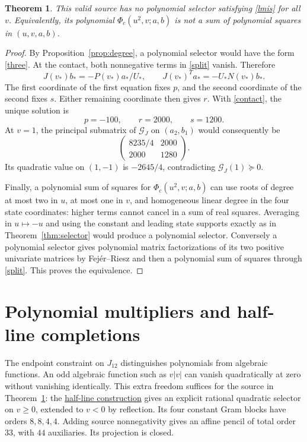 \documentclass[11pt]{article}
\newtheorem{theorem}{Theorem}
\newcommand{\PSD}{\succeq0}
\begin{document}
\begin{theorem}\label{thm:obstruction}
This valid source has no polynomial selector satisfying \eqref{lmis} for all
$v$. Equivalently, its polynomial $\Phi_c(u^2,v;a,b)$ is not a sum of polynomial
squares in $(u,v,a,b)$.
\end{theorem}
\begin{proof}
By Proposition~\ref{prop:degree}, a polynomial selector would have the form
\eqref{three}. At the contact, both nonnegative terms in \eqref{split} vanish.
Therefore
\begin{equation}
J(v_*)b_*=-P(v_*)a_*/U_*,\qquad
J(v_*)^Ta_*=-U_*N(v_*)b_*.\label{kernel}
\end{equation}
The first coordinate of the first equation fixes $p$, and the second
coordinate of the second fixes $s$. Either remaining coordinate then gives
$r$. With \eqref{contact}, the unique solution is
\begin{equation}
 p=-100,\qquad r=2000,\qquad s=1200.
 \label{forced}
\end{equation}
At $v=1$, the principal submatrix of $\mathcal G_J$ on
$(a_2,b_1)$ would consequently be
\[
 \begin{pmatrix}
 8235/4&2000\\
 2000&1280
 \end{pmatrix}.
\]
Its quadratic value on $(1,-1)$ is $-2645/4$, contradicting
$\mathcal G_J(1)\PSD$.

Finally, a polynomial sum of squares for $\Phi_c(u^2,v;a,b)$ can use roots
of degree at most two in $u$, at most one in $v$, and homogeneous linear
degree in the four state coordinates: higher terms cannot cancel in a sum
of real squares. Averaging in $u\mapsto-u$ and using the constant and leading
state supports exactly as in Theorem~\ref{thm:selector} would produce a
polynomial selector. Conversely a polynomial selector gives polynomial
matrix factorizations of its two positive univariate matrices by
Fej\'er--Riesz and then a polynomial sum of squares through \eqref{split}.
This proves the equivalence.
\end{proof}

\section{Polynomial multipliers and half-line completions}
The endpoint constraint on $J_{12}$ distinguishes polynomials from algebraic
functions. An odd algebraic function such as $v|v|$ can vanish quadratically
at zero without vanishing identically. This extra freedom suffices for the
source in Theorem~\ref{thm:obstruction}: the
\href{https://github.com/anubhav70747/q222-finite-sdp/tree/main/extracted-lifts/canonical-completion/halfline}{half-line construction}
gives an explicit rational quadratic selector on $v\geq0$, extended to
$v<0$ by reflection. Its four constant Gram blocks have orders $8,8,4,4$.
Adding source nonnegativity gives an affine pencil of total order $33$,
with $44$ auxiliaries. Its projection is closed.
\end{document}
